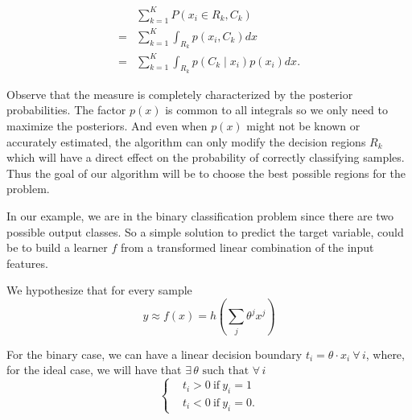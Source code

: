 \begin{equation}\label{eq:goodclassification-equation}
\begin{split}
  & \sum_{k=1}^{K} P(x_i \in R_k, C_k ) \\
= & \sum_{k=1}^{K} \int_{R_k}p(x_i,C_k) dx \\
= & \sum_{k=1}^{K} \int_{R_k}p(C_k \mid x_i) p(x_i) dx .
\end{split}
\end{equation}

Observe that the measure is completely characterized by the posterior probabilities.
The factor $p(x)$ is common to all integrals so we only need to maximize the posteriors.
And even when $p(x)$ might not be known or accurately estimated, the algorithm can only modify the decision regions $R_k$ which will have a direct effect on the probability of correctly classifying samples.
Thus the goal of our algorithm will be to choose the best possible regions for the problem.

In our example, we are in the binary classification problem since there are two possible output classes.
So a simple solution to predict the target variable, could be to build a learner $f$ from a transformed linear combination of the input features.


We hypothesize that for every sample
\begin{equation}
y \approx f(x) = h\left(\sum_{j}\theta^j x^j\right)  \label{formula:1}
\end{equation}
%

For the binary case, we can have a linear decision boundary $ t_i = \theta \cdot x_i \ \forall \, i $, where, for the ideal case, we will have that $\exists \, \theta \mbox{ such that } \forall \, i $
\begin{equation}
\begin{cases}
& t_i >0 \ \mbox{if} \ y_i=1 \\
& t_i <0 \ \mbox{if} \ y_i=0.
\end{cases}
\end{equation}


